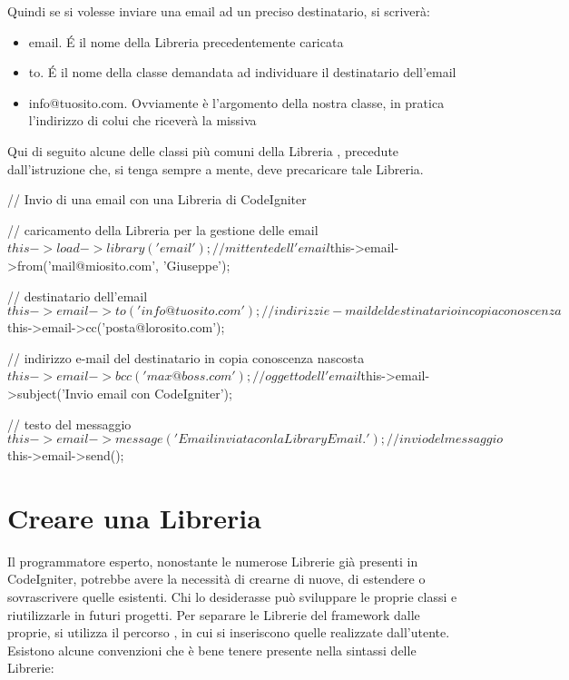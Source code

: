 Quindi se si volesse inviare una email ad un preciso destinatario, si scriverà:


\begin{itemize}
\item email. \'E il nome della Libreria precedentemente caricata
\item to. \'E il nome della classe demandata ad individuare il destinatario dell'email
\item info@tuosito.com. Ovviamente è l'argomento della nostra classe, in pratica l'indirizzo di colui che riceverà la missiva
\end{itemize}

Qui di seguito alcune delle classi più comuni della Libreria , precedute dall'istruzione che, si tenga sempre a mente, deve precaricare tale Libreria.

\begin{code}
// Invio di una email con una Libreria di CodeIgniter

// caricamento della Libreria per la gestione delle email
$this->load->library('email');

// mittente dell'email
$this->email->from('mail@miosito.com', 'Giuseppe');

// destinatario dell'email
$this->email->to('info@tuosito.com');

// indirizzi e-mail del destinatario in copia conoscenza
$this->email->cc('posta@lorosito.com');

// indirizzo e-mail del destinatario in copia conoscenza nascosta
$this->email->bcc('max@boss.com');

// oggetto dell'email
$this->email->subject('Invio email con CodeIgniter');

// testo del messaggio
$this->email->message('Email inviata con la Library Email.');

// invio del messaggio
$this->email->send();
\end{code}

\section*{Creare una Libreria}
Il programmatore esperto, nonostante le numerose Librerie già presenti in CodeIgniter, potrebbe avere la necessità di crearne di nuove, di estendere o sovrascrivere quelle esistenti. Chi lo desiderasse può sviluppare le proprie classi e riutilizzarle in futuri progetti. Per separare le Librerie del framework dalle proprie, si utilizza il percorso , in cui si inseriscono quelle realizzate dall'utente. Esistono alcune convenzioni che è bene tenere presente nella sintassi delle Librerie:

